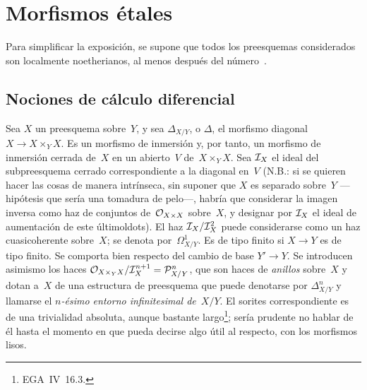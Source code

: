 \chapter{Morfismos étales}
\label{I}


Para simplificar la exposición, se supone que todos los preesquemas considerados son localmente noetherianos, al menos después del número~.

\section{Nociones de cálculo diferencial}
\label{I.1}
Sea $X$ un preesquema sobre~$Y$, y sea $\Delta_{X/Y}$, o $\Delta$,
\label{indnot:ab}%
el morfismo diagonal $X\to X\times_Y X$. Es un morfismo de inmersión y, por tanto, un morfismo de inmersión cerrada de~$X$ en un abierto~$V$ de~$X\times_Y X$. Sea $\cal{I}_X$ el ideal del subpreesquema cerrado correspondiente a la diagonal en~$V$ (N.B.: si se quieren hacer las cosas de manera intrínseca, sin suponer que $X$ es separado sobre~$Y$ ---hipótesis que sería una tomadura de pelo---, habría que considerar la imagen inversa como haz de conjuntos de~$\cal{O}_{X\times X}$ sobre~$X$, y designar por $\cal{I}_X$ el ideal de aumentación de este últimoldots). El haz $\cal{I}_X/\cal{I}_X^2$ puede considerarse como un haz cuasicoherente sobre~$X$; se denota por~$\mathit{\Omega}^1_{X/Y}$.
\label{indnot:ac}%
Es de tipo finito si $X\to Y$ es de tipo finito. Se comporta bien respecto del cambio de base $Y'\to Y$. Se introducen asimismo los haces $\cal{O}_{X\times_Y X}/\cal{I}_X^{n+1}=\cal{P}^n_{X/Y}$,
\label{indnot:ad}%
que son haces de \emph{anillos} sobre~$X$ y dotan a~$X$ de una estructura de preesquema que puede denotarse por $\Delta_{X/Y}^n$
\label{indnot:ae}%
y llamarse el \emph{$n$-ésimo entorno infinitesimal de}~$X/Y$.
%
El sorites correspondiente es de una trivialidad absoluta, aunque bastante largo\footnote{\cf EGA~IV~16.3.}; sería prudente no hablar de él hasta el momento en que pueda decirse algo útil al respecto, con los morfismos lisos.

